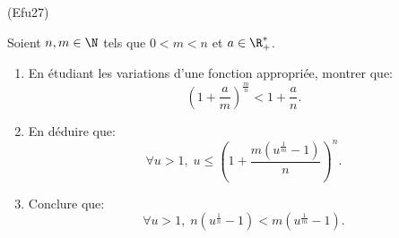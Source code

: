 \begin{tiny}(Efu27)\end{tiny} Soient $n,m\in \N$ tels que $0<m<n$ et $a\in \R_{+}^{\ast}$.
\begin{enumerate}
  \item  En étudiant les variations d'une fonction appropriée, montrer que:
\begin{displaymath}
\left ( 1 + \frac{a}{m} \right )^{\frac{m}{n}} < 1 + \frac{a}{n}.  
\end{displaymath}

  \item  En déduire que:
\begin{displaymath}
\forall u >1, \;  u \leq \left ( 1 + \frac{m(u^{\frac{1}{m}}-1)}{n}\right )^{n}.
\end{displaymath}

  \item Conclure que:
\begin{displaymath}
\forall u >1,\;  n(u^{\frac{1}{n}}-1) < m(u^{\frac{1}{m}}-1). 
\end{displaymath}
 
\end{enumerate}
